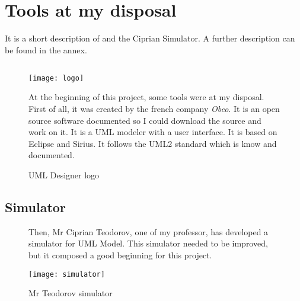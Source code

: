 







\section{Tools at my disposal}

It is a short description of \umld and the Ciprian Simulator. A further description can be found in the annex.
\newpage
\subsection{\umld}
\begin{figure}[!h]
  \begin{minipage}[h]{0.45\linewidth}
    \centering
    \texttt{[image: logo]}
    \caption{UML Designer logo}
    \label{fig:logo}
  \end{minipage}\hfill
  \begin{minipage}[h]{0.45\linewidth}

    At the beginning of this project, some tools were at my disposal. First of all, it was \umld created by the french company \textit{Obeo}. It is an open source software documented so I could download the source and work on it. It is a UML modeler with a user interface. It is based on Eclipse and Sirius. It follows the UML2 standard which is know and documented.

  \end{minipage}
\end{figure}


\subsection{Simulator}
\begin{figure}[!h]
  \begin{minipage}[h]{0.45\linewidth}

    Then, Mr Ciprian Teodorov, one of my professor, has developed a simulator for UML Model. This simulator needed to be improved, but it composed a good beginning for this project.

  \end{minipage}\hfill
  \begin{minipage}[h]{0.45\linewidth}
    \centering
    \texttt{[image: simulator]}
    \caption{Mr Teodorov simulator}
    \label{fig:sim}
  \end{minipage}
\end{figure}







